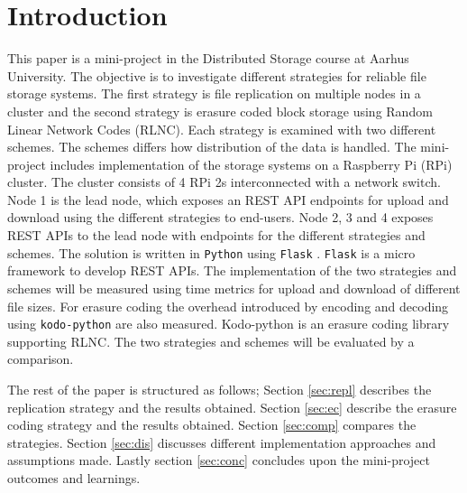 \section{Introduction}
This paper is a mini-project in the Distributed Storage course at Aarhus University. The objective is to investigate different strategies for reliable file storage systems. The first strategy is file replication on multiple nodes in a cluster and the second strategy is erasure coded block storage using Random Linear Network Codes (RLNC). Each strategy is examined with two different schemes. The schemes differs how distribution of the data is handled. The mini-project includes implementation of the storage systems on a Raspberry Pi (RPi) cluster. The cluster consists of 4 RPi 2s interconnected with a network switch. Node 1 is the lead node, which exposes an REST API endpoints for upload and download using the different strategies to end-users. Node 2, 3 and 4 exposes REST APIs to the lead node with endpoints for the different strategies and schemes. The solution is written in \texttt{Python} using \texttt{Flask} \cite{flask}. \texttt{Flask} is a micro framework to develop REST APIs. The implementation of the two strategies and schemes will be measured using time metrics for upload and download of different file sizes. For erasure coding the overhead introduced by encoding and decoding using \texttt{kodo-python} \cite{kodo} are also measured. Kodo-python is an erasure coding library supporting RLNC. The two strategies and schemes will be evaluated by a comparison.

The rest of the paper is structured as follows; Section \ref{sec:repl} describes the replication strategy and the results obtained. Section \ref{sec:ec} describe the erasure coding strategy and the results obtained. Section \ref{sec:comp} compares the strategies. Section \ref{sec:dis} discusses different implementation approaches and assumptions made. Lastly section \ref{sec:conc} concludes upon the mini-project outcomes and learnings. 
